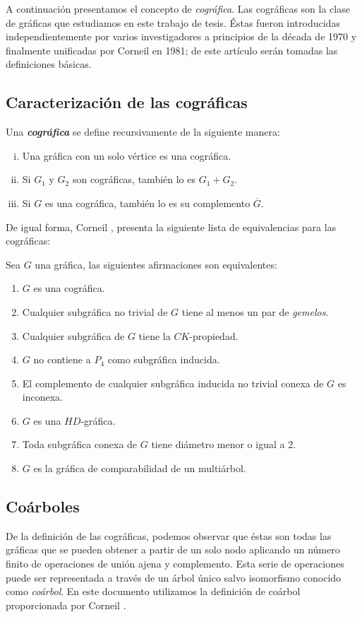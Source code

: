 A continuación presentamos el concepto de \emph{cográfica}. Las cográficas son la clase de gráficas que estudiamos en este trabajo de tesis. Éstas fueron introducidas independientemente por varios investigadores a principios de la década de 1970 y finalmente unificadas por Corneil en 1981\cite{Corneil}; de este artículo serán tomadas las definiciones básicas.

\subsection{Caracterización de las cográficas}

Una \emph{\textbf{cográfica}} se define recursivamente de la siguiente manera:

\begin{enumerate}[(i)]
    \item Una gráfica con un solo vértice es una cográfica.
    \item Si $G_1$ y $G_2$ son cográficas, también lo es $G_1 + G_2$.
    \item Si $G$ es una cográfica, también lo es su complemento $\overline{G}$.
\end{enumerate}

De igual forma, Corneil \cite{Corneil}, presenta la siguiente lista de equivalencias para las cográficas:

Sea $G$ una gráfica, las siguientes afirmaciones son equivalentes:

\begin{enumerate}[(1)]
    \item $G$ es una cográfica.
    \item Cualquier subgráfica no trivial de $G$ tiene al menos un par de \emph{gemelos}.
    \item Cualquier subgráfica de $G$ tiene la $CK$-propiedad.
    \item $G$ no contiene a $P_4$ como subgráfica inducida.
    \item El complemento de cualquier subgráfica inducida no trivial conexa de $G$ es inconexa.
    \item $G$ es una $HD$-gráfica.
    \item Toda subgráfica conexa de $G$ tiene diámetro menor o igual a 2.
    \item $G$ es la gráfica de comparabilidad de un multiárbol.
\end{enumerate}

\subsection{Coárboles}
 De la definición de las cográficas, podemos observar que éstas son todas las gráficas que se pueden obtener a partir de un solo nodo aplicando un número finito de operaciones de unión ajena y complemento. Esta serie de operaciones puede ser representada a través de un árbol único salvo isomorfismo conocido como \emph{coárbol}. En este documento utilizamos la definición de coárbol proporcionada por Corneil \cite{Corneil02}.

